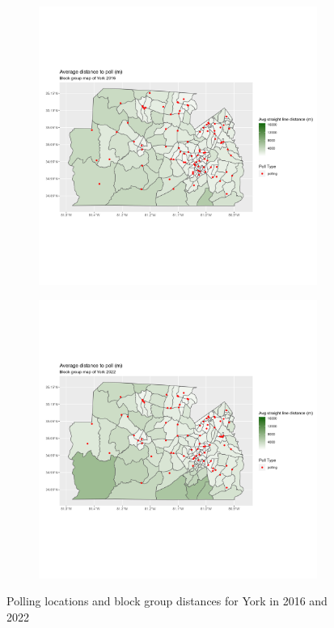 \documentclass[11pt]{article}
\theoremstyle{remark}
\theoremstyle{definition}
\begin{document}
\begin{figure}
	\begin{subfigure}{.5\textwidth}
		\centering
		\includegraphics[width=\linewidth]{result analysis/York_SC_original_configs/distance_map_York_config_original_2016_polls.png}
		\label{sfig:York_2016_bg_dist}
	\end{subfigure} 
	\begin{subfigure}{.5\textwidth}
		\centering
		\includegraphics[width=\linewidth]{result analysis/York_SC_original_configs/distance_map_York_config_original_2022_polls.png}
		\label{sfig:York_2022_bg_dist}
	\end{subfigure}
	\caption{Polling locations and block group distances for York in 2016 and 2022}
	\label{fig:York distance maps}
\end{figure}
\end{document}

